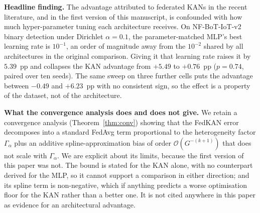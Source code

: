 \textbf{Headline finding.} The advantage attributed to federated KANs in the recent
literature, and in the first version of this manuscript, is confounded with how much
hyper-parameter tuning each architecture receives. On NF-BoT-IoT-v2 binary detection under
Dirichlet $\alpha=0.1$, the parameter-matched MLP's best learning rate is $10^{-1}$, an order
of magnitude away from the $10^{-2}$ shared by all architectures in the original comparison.
Giving it that learning rate raises it by $5.39$~pp and collapses the KAN advantage from
$+5.49$ to $+0.76$~pp ($p=0.74$, paired over ten seeds). The same sweep on three further
cells puts the advantage between $-0.49$ and $+6.23$~pp with no consistent sign, so the
effect is a property of the dataset, not of the architecture.

\textbf{What the convergence analysis does and does not give.} We retain a convergence
analysis (Theorem~\ref{thm:conv}) showing that the FedKAN error decomposes into a standard
FedAvg term proportional to the heterogeneity factor $\Gamma_\alpha$ plus an additive
spline-approximation bias of order $\mathcal{O}(G^{-(k+1)})$ that does not scale with
$\Gamma_\alpha$. We are explicit about its limits, because the first version of this paper was
not. The bound is stated for the KAN alone, with no counterpart derived for the MLP, so it
cannot support a comparison in either direction; and its spline term is non-negative, which if
anything predicts a worse optimisation floor for the KAN rather than a better one. It is not
cited anywhere in this paper as evidence for an architectural advantage.

